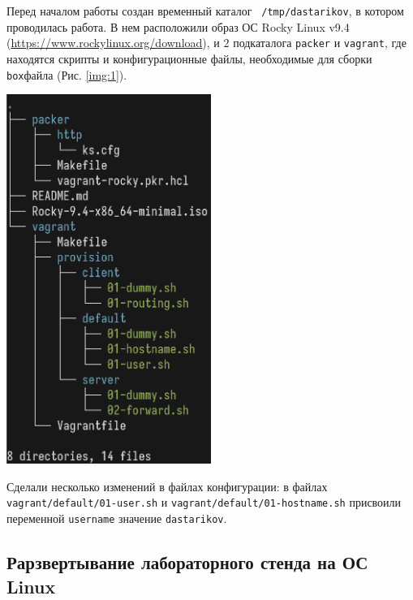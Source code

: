Перед началом работы создан временный каталог \texttt{~/tmp/dastarikov}, в котором проводилась работа. В нем расположили образ ОС Rocky Linux v9.4  (\url{https://www.rockylinux.org/download}), и 2 подкаталога \texttt{packer} и \texttt{vagrant}, где находятся скрипты и конфигурационные файлы, необходимые для сборки \texttt{box}\-файла (Рис. \ref{img:1}).
\begin{center}
    \centering
    \includegraphics[width=0.5\textwidth]{../images/img1.png}
    \label{img:1}
\end{center}

Сделали несколько изменений в файлах конфигурации: в файлах \texttt{vagrant/default/01-user.sh} и \texttt{vagrant/default/01-hostname.sh} присвоили переменной \texttt{username} значение \texttt{dastarikov}.

\subsection{Рарзвертывание лабораторного стенда на ОС Linux}


